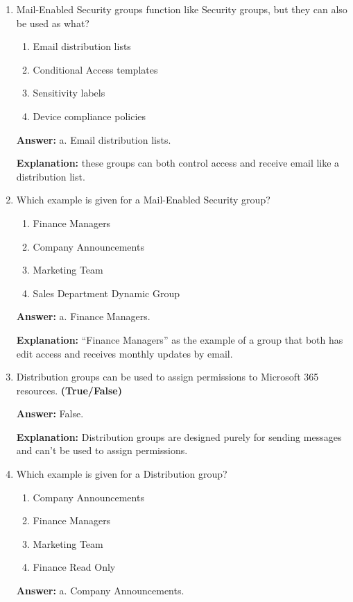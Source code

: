 \documentclass[10pt]{article}
\begin{document}
\begin{enumerate}[leftmargin=*]
\textbf{Explanation:} These are the exact resources listed in the ``Marketing Team'' example.

\item Mail-Enabled Security groups function like Security groups, but they can also be used as what?
\begin{enumerate}[label=\alph*., leftmargin=1.5em]
\item Email distribution lists
\item Conditional Access templates
\item Sensitivity labels
\item Device compliance policies
\end{enumerate}
\textbf{Answer:} a. Email distribution lists.

\textbf{Explanation:} these groups can both control access and receive email like a distribution list.

\item Which example is given for a Mail-Enabled Security group?
\begin{enumerate}[label=\alph*., leftmargin=1.5em]
\item Finance Managers
\item Company Announcements
\item Marketing Team
\item Sales Department Dynamic Group
\end{enumerate}
\textbf{Answer:} a. Finance Managers.

\textbf{Explanation:} ``Finance Managers'' as the example of a group that both has edit access and receives monthly updates by email.

\item Distribution groups can be used to assign permissions to Microsoft 365 resources. \textbf{(True/False)}

\textbf{Answer:} False.

\textbf{Explanation:} Distribution groups are designed purely for sending messages and can’t be used to assign permissions.

\item Which example is given for a Distribution group?
\begin{enumerate}[label=\alph*., leftmargin=1.5em]
\item Company Announcements
\item Finance Managers
\item Marketing Team
\item Finance Read Only
\end{enumerate}
\textbf{Answer:} a. Company Announcements.


\end{enumerate}
\end{document}
